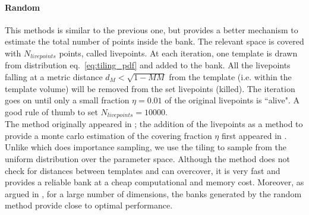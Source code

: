\documentclass[twocolumn,showpacs,preprintnumbers,nofootinbib,prd,
superscriptaddress,10pt]{revtex4-2}
\begin{document}
\paragraph{Random}\label{par:random}
This methods is similar to the previous one, but provides a better mechanism to estimate the total number of points inside the bank.
The relevant space is covered with $N_{livepoints}$ points, called livepoints. At each iteration, one template is drawn from distribution eq.~\eqref{eq:tiling_pdf} and added to the bank. All the livepoints falling at a metric distance $d_M<\sqrt{1-MM}$ from the template (i.e. within the template volume) will be removed from the set livepoints (killed). The iteration goes on until only a small fraction $\eta = 0.01$ of the original livepoints is ``alive". A good rule of thumb to set $N_{livepoints} = 10000$.
\\
The method originally appeared in \cite{Messenger:2008ta}; the addition of the livepoints as a method to provide a monte carlo estimation of the covering fraction $\eta$ first appeared in \cite{Coogan:2022qxs}. Unlike \cite{Coogan:2022qxs} which does importance sampling, we use the tiling to sample from the uniform distribution over the parameter space.
Although the method does not check for distances between templates and can overcover, it is very fast and provides a reliable bank at a cheap computational and memory cost.
Moreover, as argued in \cite{Messenger:2008ta, Allen:2021yuy, Allen:2022lqr}, for a large number of dimensions, the banks generated by the random method provide close to optimal performance.

\end{document}
